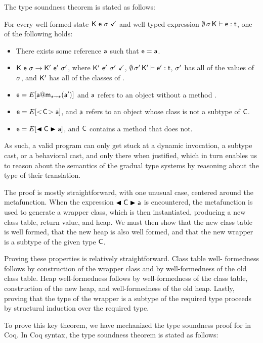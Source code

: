 \documentclass[USenglish]{tex/lipics-v2016}
\begin{document}
The \kafka type soundness theorem is stated as follows:

\begin{theorem}

\noindent For every well-formed-state $\WFq{\K~\e~\s}$ and well-typed expression
$\EnvType\emptyset\s\K\e\t$, one of the following holds:

\begin{itemize}
\item There exists some reference $\a$ such that $\e = \a$.
\item $\K~\e~\s \Red \Kp~\ep~\sp$, where $\WFq{\Kp~\ep~\sp}$, $\EnvType\emptyset\sp\Kp\ep\t$, $\sp$ has all of the values of $\s$, and $\Kp$ has all of the classes of \K.
\item $\e=E[\DynCall\a\m\ap]$ and $\a$ refers to an object without a method \m.
\item $\e=E[\SubCast\C\a]$, and $\a$ refers to an object whose class is not a subtype of $\C$.
\item $\e=E[\BehCast\C\a]$, and $\C$ contains a method that \a does not.
\end{itemize}
\end{theorem}

As such, a valid \kafka program can only get stuck at a dynamic invocation, a
subtype cast, or a behavioral cast, and only there when justified, which in turn
enables us to reason about the semantics of the gradual type systems by reasoning
about the type of their \kafka translation.

The proof is mostly straightforward, with one unusual case, centered around
the  metafunction. When the expression $\BehCast\C\a$ is
encountered, the  metafunction is used to generate a wrapper class,
which is then instantiated, producing a new class table, return value, and
heap. We must then show that the new class table is well formed, that the new
heap is also well formed, and that the new wrapper is a subtype of the given
type $\C$. 

Proving these properties is relatively straightforward. Class table well-
formedness follows by construction of the wrapper class and by well-formedness
of the old class table. Heap well-formedness follows by well-formedness of the
class table, construction of the new heap, and well-formedness of the old heap.
Lastly, proving that the type of the wrapper is a subtype of the required type
proceeds by structural induction over the required type.

To prove this key theorem, we have mechanized the type soundness proof for
\kafka in Coq.  In Coq syntax, the \kafka type soundness theorem is stated
as follows:
\end{document}

